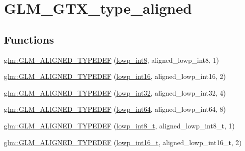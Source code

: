 \hypertarget{group__gtx__type__aligned}{}\section{G\+L\+M\+\_\+\+G\+T\+X\+\_\+type\+\_\+aligned}
\label{group__gtx__type__aligned}
\subsection*{Functions}
\begin{DoxyCompactItemize}
\item 
\hyperlink{group__gtx__type__aligned_gab5cd5c5fad228b25c782084f1cc30114}{glm\+::\+G\+L\+M\+\_\+\+A\+L\+I\+G\+N\+E\+D\+\_\+\+T\+Y\+P\+E\+D\+EF} (\hyperlink{group__gtc__type__precision_gaf9e675b6392764242ae87eb179e9d3d6}{lowp\+\_\+int8}, aligned\+\_\+lowp\+\_\+int8, 1)
\item 
\hyperlink{group__gtx__type__aligned_ga5bb5dd895ef625c1b113f2cf400186b0}{glm\+::\+G\+L\+M\+\_\+\+A\+L\+I\+G\+N\+E\+D\+\_\+\+T\+Y\+P\+E\+D\+EF} (\hyperlink{group__gtc__type__precision_ga71fc0c399fa4780507748b643733f153}{lowp\+\_\+int16}, aligned\+\_\+lowp\+\_\+int16, 2)
\item 
\hyperlink{group__gtx__type__aligned_gac6efa54cf7c6c86f7158922abdb1a430}{glm\+::\+G\+L\+M\+\_\+\+A\+L\+I\+G\+N\+E\+D\+\_\+\+T\+Y\+P\+E\+D\+EF} (\hyperlink{group__gtc__type__precision_gad9939c9d6fec1c6accc02a83c6500f08}{lowp\+\_\+int32}, aligned\+\_\+lowp\+\_\+int32, 4)
\item 
\hyperlink{group__gtx__type__aligned_ga6612eb77c8607048e7552279a11eeb5f}{glm\+::\+G\+L\+M\+\_\+\+A\+L\+I\+G\+N\+E\+D\+\_\+\+T\+Y\+P\+E\+D\+EF} (\hyperlink{group__gtc__type__precision_gab8a8e75af347592406e41b3ae2c0712b}{lowp\+\_\+int64}, aligned\+\_\+lowp\+\_\+int64, 8)
\item 
\hyperlink{group__gtx__type__aligned_ga7ddc1848ff2223026db8968ce0c97497}{glm\+::\+G\+L\+M\+\_\+\+A\+L\+I\+G\+N\+E\+D\+\_\+\+T\+Y\+P\+E\+D\+EF} (\hyperlink{group__gtc__type__precision_gae6092311f6970a305c2df19a372360a3}{lowp\+\_\+int8\+\_\+t}, aligned\+\_\+lowp\+\_\+int8\+\_\+t, 1)
\item 
\hyperlink{group__gtx__type__aligned_ga22240dd9458b0f8c11fbcc4f48714f68}{glm\+::\+G\+L\+M\+\_\+\+A\+L\+I\+G\+N\+E\+D\+\_\+\+T\+Y\+P\+E\+D\+EF} (\hyperlink{group__gtc__type__precision_gae34c3d53c4c1434fc9f26538b0185667}{lowp\+\_\+int16\+\_\+t}, aligned\+\_\+lowp\+\_\+int16\+\_\+t, 2)
\item 

\end{DoxyCompactItemize}
